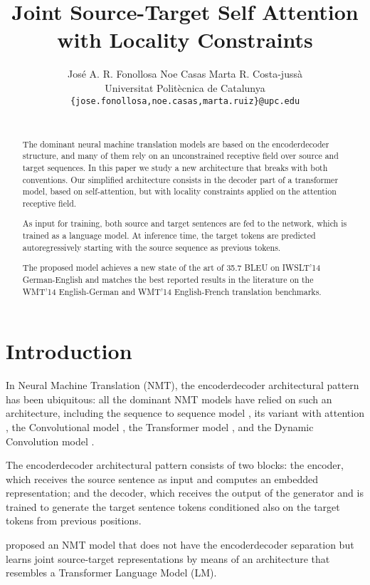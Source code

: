 \documentclass[11pt,a4paper]{article}
\title{Joint Source-Target Self Attention with Locality Constraints}
\author{José A. R. Fonollosa\hspace{7mm} Noe Casas \hspace{7mm} Marta R. Costa-jussà\\ 
  Universitat Politècnica de Catalunya\\
  \texttt{\{jose.fonollosa,noe.casas,marta.ruiz\}@upc.edu} \\
  \\}
\date{}
\begin{document}
\maketitle
\begin{abstract}

The dominant neural machine translation models are based on
the encoder\textendash decoder structure, and many of them rely on
an unconstrained receptive field over source and target sequences.
In this paper we study a new architecture that breaks with both conventions.
Our simplified architecture consists in the decoder part of
a transformer model, based on self-attention, but with locality
constraints applied on the attention receptive field.

As input for training, both source and target sentences
are fed to the network, which is trained as a language model.
At inference time, the target tokens are predicted autoregressively
starting with the source sequence as previous tokens.

The proposed model achieves a new state of the art of 35.7 BLEU
on IWSLT'14 German-English and matches the best reported results in
the literature on the WMT'14 English-German and WMT'14 
English-French translation benchmarks.
\end{abstract}

\section{Introduction} \label{sec:intro}


In Neural Machine Translation (NMT), the encoder\textendash decoder architectural
pattern has been ubiquitous: all the dominant NMT
models have relied on such an architecture, including
the sequence to sequence model \cite{sutskever2014sequence,cho2014learning},
its variant with attention \cite{bahdanau2014seq2seqattn,luong2015attention},
the Convolutional model \cite{gehring2017conv},
the Transformer model \cite{vaswani2017transformer},
and the Dynamic Convolution model \cite{wu2018dynconv}.

The encoder\textendash decoder architectural pattern consists
of two blocks: the encoder, which receives the source sentence
as input and computes an embedded representation; and
the decoder, which receives the output of the generator and
is trained to generate the target sentence tokens conditioned
also on the target tokens from previous positions.



 proposed an NMT model that does
not have the encoder\textendash decoder separation but learns joint
source-target representations by means of an architecture
that resembles a Transformer Language Model (LM).
\end{document}
